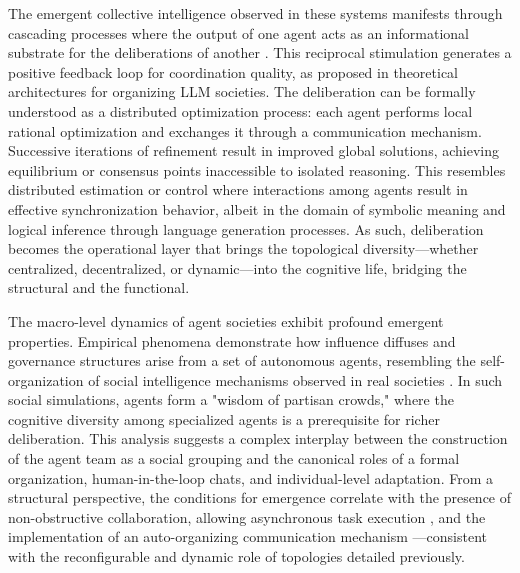 \documentclass[11pt,a4paper]{article}
\begin{document}
The emergent collective intelligence observed in these systems manifests through cascading processes where the output of one agent acts as an informational substrate for the deliberations of another \cite{arxiv:2405.03825v1}. This reciprocal stimulation generates a positive feedback loop for coordination quality, as proposed in theoretical architectures for organizing LLM societies. The deliberation can be formally understood as a distributed optimization process: each agent performs local rational optimization and exchanges it through a communication mechanism. Successive iterations of refinement result in improved global solutions, achieving equilibrium or consensus points inaccessible to isolated reasoning. This resembles distributed estimation or control where interactions among agents result in effective synchronization behavior, albeit in the domain of symbolic meaning and logical inference through language generation processes. As such, deliberation becomes the operational layer that brings the topological diversity---whether centralized, decentralized, or dynamic---into the cognitive life, bridging the structural and the functional.

The macro-level dynamics of agent societies exhibit profound emergent properties. Empirical phenomena demonstrate how influence diffuses and governance structures arise from a set of autonomous agents, resembling the self-organization of social intelligence mechanisms observed in real societies \cite{arxiv:2405.03825v1}. In such social simulations, agents form a "wisdom of partisan crowds," where the cognitive diversity among specialized agents is a prerequisite for richer deliberation. This analysis suggests a complex interplay between the construction of the agent team as a social grouping and the canonical roles of a formal organization, human-in-the-loop chats, and individual-level adaptation. From a structural perspective, the conditions for emergence correlate with the presence of non-obstructive collaboration, allowing asynchronous task execution \cite{arxiv:2402.04578v3}, and the implementation of an auto-organizing communication mechanism \cite{arxiv:2403.08282v2}---consistent with the reconfigurable and dynamic role of topologies detailed previously.
\end{document}

